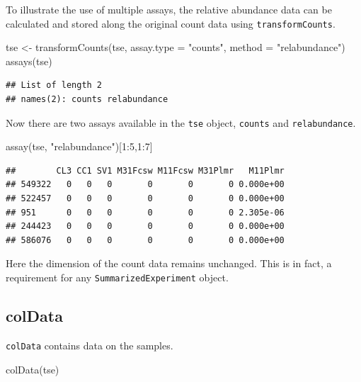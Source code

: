 \documentclass[
]{book}
\newenvironment{Shaded}{\begin{snugshade}}{\end{snugshade}}
\newcommand{\AttributeTok}[1]{\textcolor[rgb]{0.77,0.63,0.00}{#1}}
\newcommand{\DecValTok}[1]{\textcolor[rgb]{0.00,0.00,0.81}{#1}}
\newcommand{\FunctionTok}[1]{\textcolor[rgb]{0.00,0.00,0.00}{#1}}
\newcommand{\NormalTok}[1]{#1}
\newcommand{\OtherTok}[1]{\textcolor[rgb]{0.56,0.35,0.01}{#1}}
\newcommand{\SpecialCharTok}[1]{\textcolor[rgb]{0.00,0.00,0.00}{#1}}
\newcommand{\StringTok}[1]{\textcolor[rgb]{0.31,0.60,0.02}{#1}}
\begin{document}
To illustrate the use of multiple assays, the relative abundance data can be
calculated and stored along the original count data using \texttt{transformCounts}.

\begin{Shaded}
\begin{Highlighting}[]
\NormalTok{tse }\OtherTok{\textless{}{-}} \FunctionTok{transformCounts}\NormalTok{(tse, }\AttributeTok{assay.type =} \StringTok{"counts"}\NormalTok{, }\AttributeTok{method =} \StringTok{"relabundance"}\NormalTok{)}
\FunctionTok{assays}\NormalTok{(tse)}
\end{Highlighting}
\end{Shaded}

\begin{verbatim}
## List of length 2
## names(2): counts relabundance
\end{verbatim}

Now there are two assays available in the \texttt{tse} object, \texttt{counts} and
\texttt{relabundance}.

\begin{Shaded}
\begin{Highlighting}[]
\FunctionTok{assay}\NormalTok{(tse, }\StringTok{"relabundance"}\NormalTok{)[}\DecValTok{1}\SpecialCharTok{:}\DecValTok{5}\NormalTok{,}\DecValTok{1}\SpecialCharTok{:}\DecValTok{7}\NormalTok{]}
\end{Highlighting}
\end{Shaded}

\begin{verbatim}
##        CL3 CC1 SV1 M31Fcsw M11Fcsw M31Plmr   M11Plmr
## 549322   0   0   0       0       0       0 0.000e+00
## 522457   0   0   0       0       0       0 0.000e+00
## 951      0   0   0       0       0       0 2.305e-06
## 244423   0   0   0       0       0       0 0.000e+00
## 586076   0   0   0       0       0       0 0.000e+00
\end{verbatim}

Here the dimension of the count data remains unchanged. This is in
fact, a requirement for any \texttt{SummarizedExperiment} object.

\hypertarget{coldata}{%
\subsection{colData}\label{coldata}}

\texttt{colData} contains data on the samples.

\begin{Shaded}
\begin{Highlighting}[]
\FunctionTok{colData}\NormalTok{(tse)}
\end{Highlighting}
\end{Shaded}
\end{document}
